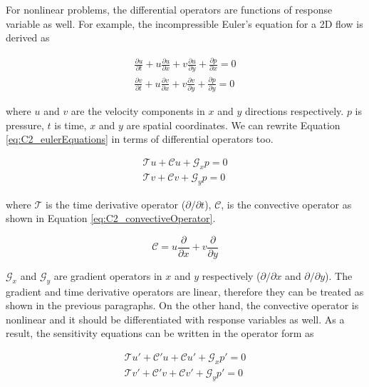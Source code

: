 For nonlinear problems, the differential operators are functions of response variable as well. For example, the incompressible Euler's equation for a 2D flow is derived as

\begin{subequations}\label{eq:C2_eulerEquations}
\begin{gather}
	\frac{\partial u}{\partial t} +
	u \frac{\partial u}{\partial x} + v \frac{\partial u}{\partial y} +
	\frac{\partial p}{\partial x} = 0 
	\\
	\frac{\partial v}{\partial t} +
	u \frac{\partial v}{\partial x} + v \frac{\partial v}{\partial y} +
	\frac{\partial p}{\partial y} = 0
\end{gather}
\end{subequations}

where $u$ and $v$ are the velocity components in $x$ and $y$ directions respectively. $p$ is pressure, $t$ is time, $x$ and $y$ are spatial coordinates. We can rewrite Equation \eqref{eq:C2_eulerEquations} in terms of differential operators too.

\begin{subequations}
\begin{gather*}
	\mathcal{T} u +
	\mathcal{C} u +
	\mathcal{G}_x p = 0 
	\\
	\mathcal{T} v +
	\mathcal{C} v +
	\mathcal{G}_y p = 0 
\end{gather*}
\end{subequations}

where $\mathcal{T}$ is the time derivative operator ($\partial /\partial t$), $\mathcal{C}$, is the convective operator as shown in Equation \eqref{eq:C2_convectiveOperator}.

\begin{equation}\label{eq:C2_convectiveOperator}
	\mathcal{C} = u \frac{\partial}{\partial x} + v \frac{\partial}{\partial y}
\end{equation}

$\mathcal{G}_x$ and $\mathcal{G}_y$ are gradient operators in $x$ and $y$ respectively ($\partial /\partial x$ and $\partial /\partial y$). The gradient and time derivative operators are linear, therefore they can be treated as shown in the previous paragraphs. On the other hand, the convective operator is nonlinear and it should be differentiated with response variables as well. As a result, the sensitivity equations can be written in the operator form as

\begin{subequations}\label{eq:C2_eulerEquationsSA}
\begin{gather}
	\mathcal{T} u' +
	\mathcal{C}' u + \mathcal{C} u' +
	\mathcal{G}_x p' = 0 
	\\
	\mathcal{T} v' +
	\mathcal{C}' v + \mathcal{C} v' +
	\mathcal{G}_y p' = 0 
\end{gather}
\end{subequations}

